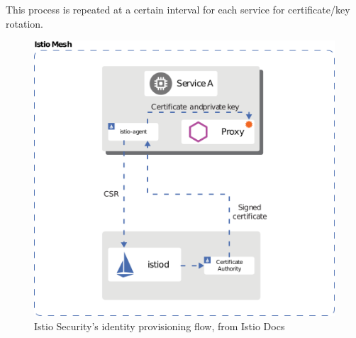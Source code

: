 \noindent This process is repeated at a certain interval for each service for certificate/key rotation.

\begin{figure}
    \centering
    \includegraphics[scale=0.47]{chapters/images/chp1/cert-prov.png}
    \caption{Istio Security's identity provisioning flow, from Istio Docs}
    \label{fig:idprov}
\end{figure}


